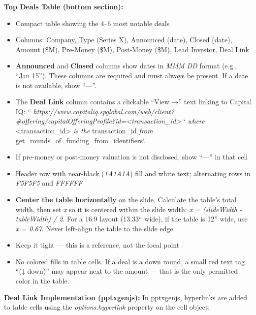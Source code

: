 \documentclass[11pt]{article}
\begin{document}
\textbf{Top Deals Table (bottom section):}

\begin{itemize}[leftmargin=*,itemsep=2pt,topsep=2pt]
\item {} Compact table showing the 4–6 most notable deals
\item {} Columns: Company, Type (Series X), Announced (date), Closed (date), Amount (\$M), Pre-Money (\$M), Post-Money (\$M), Lead Investor, Deal Link
\item {} \textbf{Announced} and \textbf{Closed} columns show dates in \emph{MMM DD} format (e.g., ``Jan 15''). These columns are required and must always be present. If a date is not available, show ``—''.
\item {} The \textbf{Deal Link} column contains a clickable ``View →'' text linking to Capital IQ: ``\emph{ https://www.capitaliq.spglobal.com/web/client?\#offering/capitalOfferingProfile?id=<transaction\_\allowbreak{}id> }`\emph{ where }<transaction\_\allowbreak{}id>\emph{ is the }transaction\_\allowbreak{}id\emph{ from }get\_\allowbreak{}rounds\_\allowbreak{}of\_\allowbreak{}funding\_\allowbreak{}from\_\allowbreak{}identifiers`.
\item {} If pre-money or post-money valuation is not disclosed, show ``—'' in that cell
\item {} Header row with near-black (\emph{1A1A1A}) fill and white text; alternating rows in \emph{F5F5F5} and \emph{FFFFFF}
\item {} \textbf{Center the table horizontally} on the slide. Calculate the table's total width, then set \emph{x} so it is centered within the slide width: \emph{x = (slideWidth - tableWidth) / 2}. For a 16:9 layout (13.33`` wide), if the table is 12'' wide, use \emph{x = 0.67}. Never left-align the table to the slide edge.
\item {} Keep it tight — this is a reference, not the focal point
\item {} No colored fills in table cells. If a deal is a down round, a small red text tag ``(↓ down)'' may appear next to the amount — that is the only permitted color in the table.
\end{itemize}

\textbf{Deal Link Implementation (pptxgenjs):} In pptxgenjs, hyperlinks are added to table cells using the \emph{options.hyperlink} property on the cell object:
\end{document}
